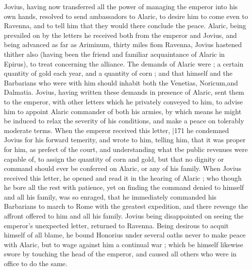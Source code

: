 Jovius, having now transferred all the power of managing the emperor into his own hands, resolved to send ambassadors to Alaric, to desire him to come even to Ravenna, and to tell him that they would there conclude the peace. Alaric, being prevailed on by the letters he received both from the emperor and Jovius, and being advanced as far as Ariminum, thirty miles fiom Ravenna, Jovius hastened thither also (having been the friend and familiar acquaintance of Alaric in Epirus), to treat concerning the alliance. The demands of Alaric were ; a certain quantity of gold each year, and a quantity of corn ; and that himself and the Barbarians who were with him should inhabit both the Venetias, Noricum,\emph{}and Dalmatia. Jovius, having written these demands in presence of Alaric, sent them to the emperor, with other letters which he privately conveyed to him, to advise him to appoint Alaric commander of both his armies, by which means he might be induced to relax the severity of his conditions, and make a peace on tolerably moderate terms. When the emperor received this letter,
|171 he condemned Jovius for his forward temerity, and wrote to him, telling him, that it was proper for him, as prefect of the court, and understanding what tbe public revenues were capable of, to assign the quantity of corn and gold, but that no dignity or command should ever be conferred on Alaric, or any of his family. When Jovius received this letter, he opened and read it in the hearing of Alaric ; who though he bore all the rest with patience, yet on finding the command denied to himself and all his family, was so enraged, that he immediately commanded his Barbarians to march to Rome with the greatest expedition, and there revenge the affront offered to him and all his family. Jovius being disappointed on seeing the emperor's unexpected letter, returned to Ravenna. Being desirous to acquit himself of all blame, he bound Honorius under several oaths never to make peace with Alaric, but to wage against him a continual war ; which be himself likewise swore by touching the head of the emperor, and caused all others who were in office to do the same.

